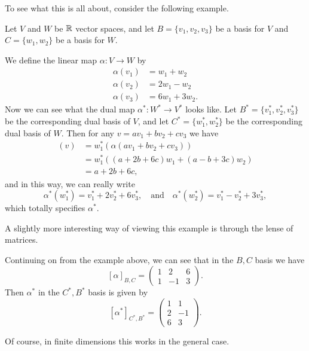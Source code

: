 \documentclass[a4paper]{scrartcl}
\begin{document}
To see what this is all about, consider the following example.

\begin{example}
Let $V$ and $W$ be $\mathbb{R}$ vector spaces, and let $B = \{v_1, v_2, v_3\}$ be a basis for $V$ and $C = \{w_1, w_2\}$ be a basis for $W$.

We define the linear map $\alpha: V \rightarrow W$ by
\begin{align*}
    \alpha(v_1) &= w_1 + w_2 \\
    \alpha(v_2) &= 2w_1 - w_2 \\
    \alpha(v_3) &= 6w_1 + 3w_2.
\end{align*}
Now we can see what the dual map $\alpha^*: W^* \rightarrow V^*$ looks like. Let $B^* = \{v_1^*, v_2^*, v_3^*\}$ be the corresponding dual basis of $V$, and let $C^* = \{w_1^*, w_2^*\}$ be the corresponding dual basis of $W$. Then for any $v = av_1 + bv_2 + cv_3$ we have
\begin{align*}
    [\alpha^*(w_1^*)](v) &= w_1^*(\alpha(av_1 + bv_2 + cv_3)) \\
    &= w_1^*((a + 2b + 6c)w_1 + (a - b + 3c)w_2)\\
    &= a + 2b + 6c,
\end{align*}
and in this way, we can really write
$$
\alpha^*(w_1^*) = v_1^* +  2v_2^* + 6v_3^*, \quad \text{and} \quad \alpha^*(w_2^*) = v_1^* - v_2^* + 3v_3^*,
$$
which totally specifies $\alpha^*$.
\end{example}

A slightly more interesting way of viewing this example is through the lense of matrices.

\begin{example}
Continuing on from the example above, we can see that in the $B, C$ basis we have
$$
[\alpha]_{B, C} = \begin{pmatrix}
    1 & 2 & 6 \\
    1 & -1 & 3
\end{pmatrix}.
$$
Then $\alpha^*$ in the $C^*, B^*$ basis is given by
$$
[\alpha^*]_{C^*, B^*} = \begin{pmatrix}
    1 & 1 \\ 2 & -1 \\ 6 & 3
\end{pmatrix}.
$$
\end{example}

Of course, in finite dimensions this works in the general case.
\end{document}

